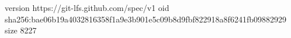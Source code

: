 version https://git-lfs.github.com/spec/v1
oid sha256:bae06b19a4032816358f1a9e3b901e5c09b8d9fbf822918a8f6241fb09882929
size 8227
